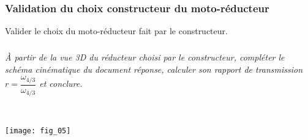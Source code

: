 \begin{multicols}{2}
\subsubsection*{Validation du choix constructeur du moto-réducteur}
\begin{obj}
Valider le choix du moto-réducteur fait par le constructeur.
\end{obj}

\subparagraph{}\textit{À partir de la vue 3D du réducteur choisi par le constructeur, compléter le schéma cinématique du document réponse, calculer son rapport de transmission $r = \dfrac{\omega_{4/3}}{\omega_{4/3}}$ et conclure.}
\ifprof
\begin{corrige}~\\
\end{corrige}
\else
\fi


\begin{center}
\texttt{[image: fig\_05]}
\end{center}



\ifprof
\else
\end{multicols}
\fi


